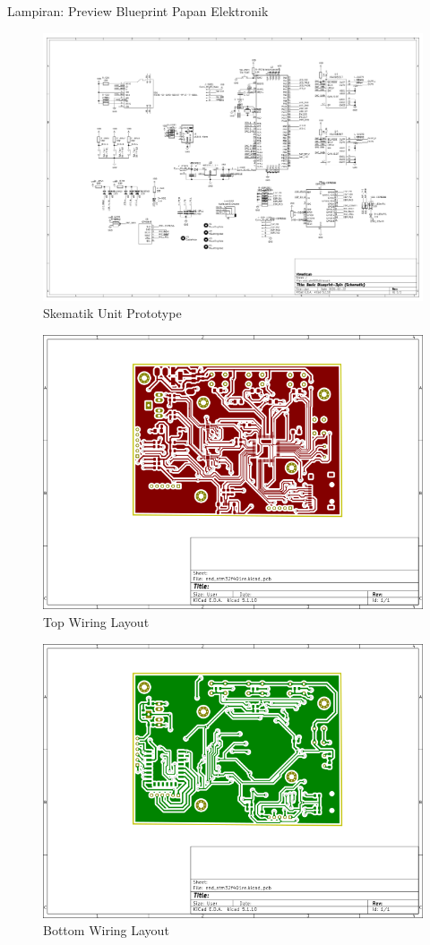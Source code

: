 \documentclass[12pt,a4paper,landscape]{article}
\begin{document}
\begin{table}[H]
\begin{center}
\begin{tabular}{|p{3cm}|c|p{4cm}|c|p{4cm}|}
				\bottomrule
			\end{tabular}
		\end{center}
	\end{table}
	
	\newpage
	\Large{Lampiran: Preview Blueprint Papan Elektronik}
	\begin{figure}[!ht]
		\centering
		\includegraphics[width=0.8\linewidth]{images/blueprint/skema}
		\caption{Skematik Unit Prototype}
	\end{figure}
	\newpage
	\begin{figure}[!ht]
		\centering
		\includegraphics[width=0.8\linewidth]{images/blueprint/F_Cu}
		\caption{Top Wiring Layout}
	\end{figure}
	\newpage
	\begin{figure}[!ht]
		\centering
		\includegraphics[width=0.8\linewidth]{images/blueprint/B_Cu}
		\caption{Bottom Wiring Layout}
	\end{figure}
\end{document}
